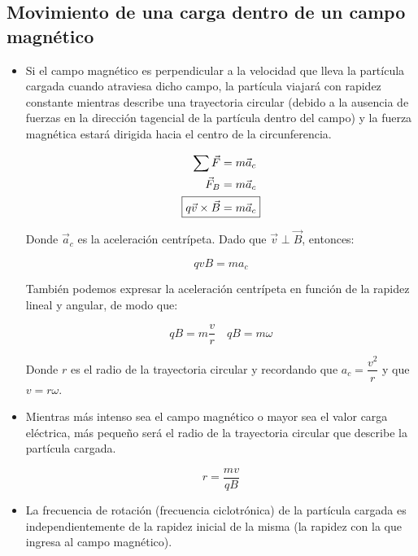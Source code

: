 \documentclass[a4paper,10pt]{article}
\begin{document}

\subsection{Movimiento de una carga dentro de un campo magnético}

\begin{itemize}
    
\item Si el campo magnético es perpendicular a la velocidad que lleva la
partícula cargada cuando atraviesa dicho campo, la partícula viajará con
rapidez constante mientras describe una trayectoria circular (debido a
la ausencia de fuerzas en la dirección tagencial de la partícula dentro del
campo) y la fuerza magnética estará dirigida hacia el centro de la circunferencia.

\begin{align*}
    \sum\vec{F}&=m\vec{a}_c\\
    \vec{F}_B&=m\vec{a}_c\\
    \Aboxed{
    q\vec{v}\times\vec{B}&=m\vec{a}_c
    }
\end{align*}

Donde $\vec{a}_c$ es la aceleración centrípeta.
Dado que $\vec{v}\perp\vec{B}$, entonces:

\begin{equation*}
    \boxed{
    qvB=ma_c
    }
\end{equation*}

También podemos expresar la aceleración centrípeta en función de la
rapidez lineal y angular, de modo que:

\begin{equation*}
    \boxed{
    qB=m\frac{v}{r}
    }
    \quad
    \boxed{
    qB=m\omega
    } 
\end{equation*}

Donde $r$ es el radio de la trayectoria circular y recordando que $a_c=\dfrac{v^2}{r}$
y que $v=r\omega$.

\item Mientras más intenso sea el campo magnético o mayor sea el valor carga
eléctrica, más pequeño será el radio de la trayectoria circular que describe
la partícula cargada.

\begin{equation*}
    \boxed{
    r=\frac{mv}{qB}
    }
\end{equation*}

\item La frecuencia de rotación (frecuencia ciclotrónica) de la partícula cargada
es independientemente de la rapidez inicial de la misma (la rapidez con
la que ingresa al campo magnético).


\end{itemize}
\end{document}
